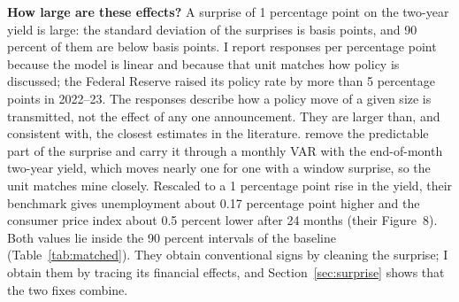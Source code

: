 \documentclass[11pt]{article}
\begin{document}
\textbf{How large are these effects?} A surprise of 1 percentage point on the two-year yield is large: the standard deviation of the surprises is  basis points, and 90 percent of them are below  basis points. I report responses per percentage point because the model is linear and because that unit matches how policy is discussed; the Federal Reserve raised its policy rate by more than 5 percentage points in 2022--23. The responses describe how a policy move of a given size is transmitted, not the effect of any one announcement. They are larger than, and consistent with, the closest estimates in the literature. \citet{bauer2023} remove the predictable part of the surprise and carry it through a monthly VAR with the end-of-month two-year yield, which moves nearly one for one with a window surprise, so the unit matches mine closely. Rescaled to a 1 percentage point rise in the yield, their benchmark gives unemployment about 0.17 percentage point higher and the consumer price index about 0.5 percent lower after 24 months (their Figure~8). Both values lie inside the 90 percent intervals of the baseline (Table~\ref{tab:matched}). They obtain conventional signs by cleaning the surprise; I obtain them by tracing its financial effects, and Section~\ref{sec:surprise} shows that the two fixes combine.
\end{document}
